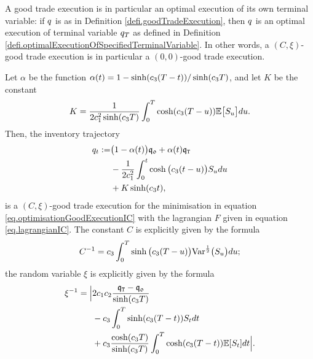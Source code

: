 \documentclass[10pt,a4paper]{article}
\begin{document}
\begin{remark}
A good trade execution is in particular an optimal execution of its own terminal variable: if $q$ is as in Definition \ref{defi.goodTradeExecution}, then $q$ is an optimal execution of terminal variable $q_T$ as defined in Definition \ref{defi.optimalExecutionOfSpecifiedTerminalVariable}. In other words, a $(C,\xi)$-good trade execution is in particular a $(0,0)$-good trade execution.
\end{remark}

\begin{prop} \label{prop.goodExecutionIC}
Let $\alpha$ be the function $\alpha(t)=1-\sinh(c_{3}(T-t))/\sinh(c_{3} T)$,
and let $K$ be the constant 
\[
K= \frac{1}{2c_{1}^{2} \sinh(c_{3} T)}
\int_{0}^{T} \cosh(c_{3} (T-u))\mathbb{{E}}\big[S_u\big]du. 
\]
Then, the inventory trajectory
\begin{equation}\label{eq.goodExecutionIC}
\begin{split}
q_t:= & 
\big(1-\alpha(t)\big) \mathfrak{q_0} + \alpha(t)\mathfrak{q}_{\mathtt{T} } \\
&- \frac{1}{2c_{1}^{2}}
\int_{0}^{t} \cosh\big(c_{3} (t-u)\big)S_udu \\
&+ K \sinh(c_{3} t),
\end{split}
\end{equation}
is a $(C,\xi)$-good trade execution for the minimisation in equation \eqref{eq.optimisationGoodExecutionIC} with the lagrangian $F$ given in equation \eqref{eq.lagrangianIC}. The constant $C$ is explicitly given by the formula
\[
C^{-1} = c_{3}
\int_{0}^{T} \sinh\big(c_{3} (T-u)\big)\mathrm{Var}^{\frac{1}{2}}\big(S_u\big) du;
\]
the random variable $\xi$ is explicitly given by the formula
\begin{equation*}
\begin{split}
\xi^{-1} = 
\Big\lvert & 
2c_{1}c_{2} \frac{ \mathfrak{q}_{\mathtt{T} } - \mathfrak{q_0} }{\sinh(c_{3} T)} \\
& -c_{3} \int_{0}^{T} \sinh (c_{3} (T - t))S_t dt \\
 & +c_{3} \frac{\cosh(c_{3} T)}{\sinh(c_{3}T)}
 \int_{0}^{T} \cosh(c_{3} (T - t))\mathbb{{E}}[S_t] dt 
 \Big\rvert. 
\end{split}
\end{equation*}
\end{prop}
\end{document}
